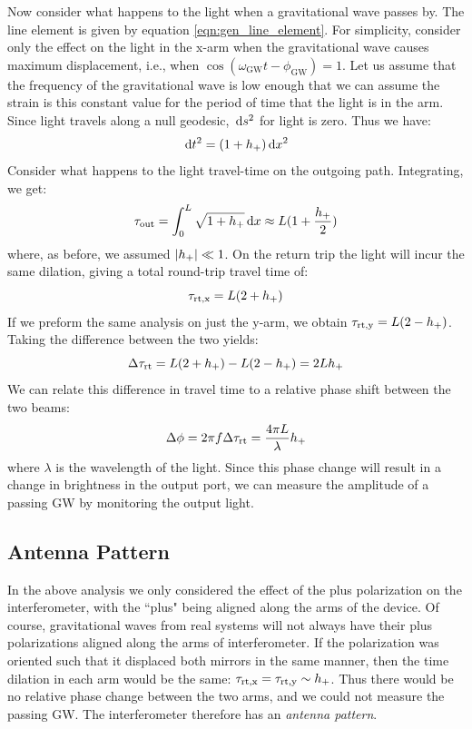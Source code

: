Now consider what happens to the light when a gravitational wave passes by. The line element is given by equation \ref{eqn:gen_line_element}. For simplicity, consider only the effect on the light in the x-arm when the gravitational wave causes maximum displacement, i.e., when $\cos(\omega_{\mathrm{GW}}t - \phi_{\mathrm{GW}}) = 1$. Let us assume that the frequency of the gravitational wave is low enough that we can assume the strain is this constant value for the period of time that the light is in the arm. Since light travels along a null geodesic, $\,\mathrm{d} s^2$ for light is zero. Thus we have:
\begin{equation}
\,\mathrm{d} t^2 = (1 + h_{+})\,\mathrm{d} x^2
\end{equation}
Consider what happens to the light travel-time on the outgoing path. Integrating, we get:
\begin{equation}
\tau_{\mathrm{out}} = \int_{0}^{L} \sqrt{1 + h_{+}} \,\mathrm{d} x \approx L(1 + \frac{h_{+}}{2})
\end{equation}
where, as before, we assumed $|h_{+}| \ll 1$. On the return trip the light will incur the same dilation, giving a total round-trip travel time of:
\begin{equation}
\tau_{\mathrm{rt,x}} = L(2 + h_{+})
\end{equation}
If we preform the same analysis on just the y-arm, we obtain $\tau_{\mathrm{rt,y}} = L(2-h_{+})$. Taking the difference between the two yields:
\begin{equation}
\Delta \tau_{\mathrm{rt}} = L(2+h_{+}) - L(2-h_{+}) = 2L h_{+}
\end{equation}
We can relate this difference in travel time to a relative phase shift between the two beams:
\begin{equation}
\Delta \phi = 2\pi f \Delta \tau_{\mathrm{rt}} = \frac{4 \pi L}{\lambda} h_{+}
\end{equation}
where $\lambda$ is the wavelength of the light. Since this phase change will result in a change in brightness in the output port, we can measure the amplitude of a passing \ac{GW} by monitoring the output light.

\subsection{Antenna Pattern}

In the above analysis we only considered the effect of the plus polarization on the interferometer, with the ``plus" being aligned along the arms of the device. Of course, gravitational waves from real systems will not always have their plus polarizations aligned along the arms of interferometer. If the polarization was oriented such that it displaced both mirrors in the same manner, then the time dilation in each arm would be the same: $\tau_{\mathrm{rt,x}} = \tau_{\mathrm{rt,y}} \sim h_{+}$. Thus there would be no relative phase change between the two arms, and we could not measure the passing \ac{GW}. The interferometer therefore has an \emph{antenna pattern}.

